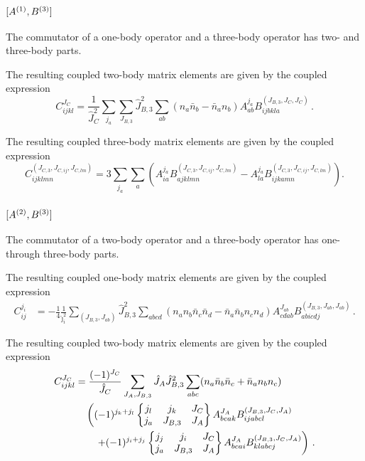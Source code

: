 \subsubsection{
  \texorpdfstring{$[{A}^{(1)}, {B}^{(3)}]$}{[1, 3]}
}

The commutator of a one-body operator and a three-body operator has
two- and three-body parts.

The resulting coupled two-body matrix elements are given by the coupled expression
\begin{equation}
  C_{ijkl}^{J_C} = \frac{1}{\hat{J}_{C}^2}
  \sum_{j_a}
  \sum_{J_{B,3}} \hat{J}_{B,3}^2
  \sum_{ab} (n_a \bar{n}_b - \bar{n}_a n_b)
  A_{ab}^{j_a} B_{ijbkla}^{(J_{B,3}, J_{C}, J_{C})}\,.
\end{equation}

The resulting coupled three-body matrix elements are given by the coupled expression
\begin{equation}
  C_{ijklmn}^{(J_{C,3}, J_{C,ij}, J_{C,lm})} =
  3 \sum_{j_a} \sum_{a}
  \left(
  A_{ia}^{j_a} B_{ajklmn}^{(J_{C,3}, J_{C,ij}, J_{C,lm})}
  - A_{la}^{j_a} B_{ijkamn}^{(J_{C,3}, J_{C,ij}, J_{C,lm})}
  \right).
\end{equation}

\subsubsection{
  \texorpdfstring{$[{A}^{(2)}, {B}^{(3)}]$}{[2, 3]}
}

The commutator of a two-body operator and a three-body operator has
one- through three-body parts.

The resulting coupled one-body matrix elements are given by the coupled expression
\begin{equation}
  \begin{split}
    C_{ij}^{j_i} &= - \frac{1}{4} \frac{1}{\hat{\jmath}_{i}^2}
    \sum_{(J_{B,3}, J_{ab})}
    \hat{J}_{B,3}^2
    \sum_{abcd}
    (n_a n_b \bar{n}_c \bar{n}_d - \bar{n}_a \bar{n}_b n_c n_d)
    A_{cdab}^{J_{ab}} B_{abicdj}^{(J_{B,3}, J_{ab}, J_{ab})}\,.
  \end{split}
\end{equation}

The resulting coupled two-body matrix elements are given by the coupled expression
\begin{equation}
  \begin{split}
    C_{ijkl}^{J_C} &= \frac{(-1)^{J_C}}{\hat{J}_C}
    \sum_{J_A, J_{B,3}} \hat{J}_A \hat{J}_{B,3}^2
    \sum_{abc}
    (n_a \bar{n}_b \bar{n}_c + \bar{n}_a n_b n_c) \\
    & \quad \left(
    (-1)^{j_k + j_l}
    \sixj{j_l}{j_k}{J_C}{j_a}{J_{B,3}}{J_A}
    A_{bcak}^{J_A} B_{ijabcl}^{(J_{B,3}, J_C, J_A)}
    \right.\\
    &\quad\quad \left. + (-1)^{j_i + j_j}
    \sixj{j_j}{j_i}{J_C}{j_a}{J_{B,3}}{J_A}
    A_{bcai}^{J_A} B_{klabcj}^{(J_{B,3}, J_C, J_A)}
    \right)\,.
  \end{split}
\end{equation}


